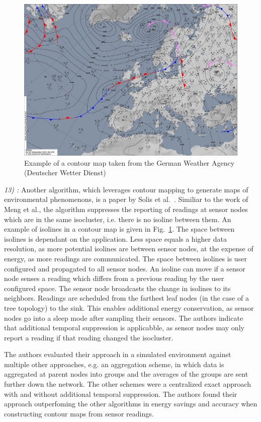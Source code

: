 \begin{figure}[h]
\includegraphics[width=\linewidth]{images/contour-map.jpg}
\caption{Example of a contour map taken from the German Weather Agency (Deutscher Wetter Dienst)~\cite{dwd}}
\label{fig:contour map}
\centering
\end{figure}

\textit{13) :}
Another algorithm, which leverages contour mapping to generate maps of
environmental phenomenons, is a paper by Solis et
al.~\cite{solis2005efficient}. Similiar to the work of Meng et al., the
algorithm suppresses the reporting of readings at sensor nodes which are in the
same isocluster, i.e. there is no isoline between them. An example of isolines
in a contour map is given in Fig.~\ref{fig:contour map}. The space between
isolines is dependant on the application. Less space equals a higher data
resolution, as more potential isolines are between sensor nodes, at the expense
of energy, as more readings are communicated. The space between isolines is
user configured and propagated to all sensor nodes. An isoline can move if a
sensor node senses a reading which differs from a previous reading by the user
configured space. The sensor node broadcasts the change in isolines to its
neighbors. Readings are scheduled from the farthest leaf nodes (in the case of
a tree topology) to the sink. This enables additional energy conservation,
as sensor nodes go into a sleep mode after sampling their sensors. The authors
indicate that additional temporal suppression is applicabble, as sensor nodes
may only report a reading if that reading changed the isocluster.

The authors evaluated their approach in a simulated environment against
multiple other approaches, e.g. an aggregation scheme, in which data is
aggregated at parent nodes into groups and the averages of the groups are sent
further down the network. The other schemes were a centralized exact approach
with and without additional temporal suppression. The authors found their
approach outperfoming the other algorithms in energy savings and accuracy when
constructing contour maps from sensor readings.

